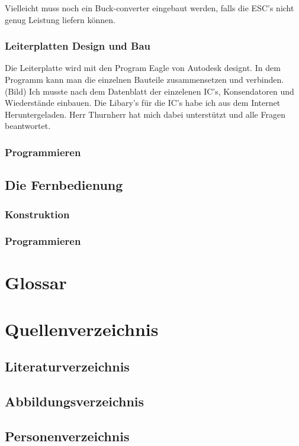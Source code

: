\documentclass[12pt,a4paper, ngerman]{article}
\begin{document}
Vielleicht muss noch ein Buck-converter eingebaut  werden, falls die ESC's nicht genug Leistung liefern können.
\subsubsection{Leiterplatten Design und Bau}
Die Leiterplatte wird mit den Program Eagle von Autodesk designt. In dem Programm kann man die einzelnen Bauteile zusammensetzen und verbinden. (Bild) Ich musste nach dem Datenblatt der einzelenen IC's, Konsendatoren und Wiederstände einbauen. Die Libary's für die IC's habe ich aus dem Internet Heruntergeladen. Herr Thurnherr hat mich dabei unterstützt und alle Fragen beantwortet. 
\subsubsection{Programmieren}
\subsection{Die Fernbedienung}
\subsubsection{Konstruktion}
\subsubsection{Programmieren}
\newpage
\section{Glossar}


\newpage
\section{Quellenverzeichnis}
\subsection{Literaturverzeichnis}
\subsection{Abbildungsverzeichnis}
\subsection{Personenverzeichnis}
\end{document}
